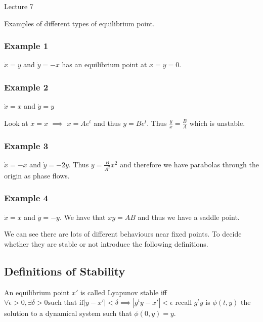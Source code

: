 \begin{center}

Lecture 7

\end{center}

Examples of different types of equilibrium point.

\subsubsection*{Example 1}

$\dot{x} = y$ and $\dot{y} = - x$ has an equilibrium point at $x = y = 0$.

\subsubsection*{Example 2}

$\dot{x} = x$ and $\dot{y} = y$

Look at $\dot{x} = x$ $\implies$ $x = Ae^t$ and thus $y = B e^t$. Thus $\frac{y}{x} = \frac{B}{A}$ which is unstable.

\subsubsection*{Example 3}

$\dot{x} = - x$ and $\dot{y} = -2y$. Thus $y = \frac{B}{A^2}x^2$ and therefore we have parabolas through the origin as phase flows.

\subsubsection*{Example 4}

$\dot{x} = x$ and $\dot{y} = -y$. We have that $xy = AB$ and thus we have a saddle point.

\vspace{\baselineskip}

We can see there are lots of different behaviours near fixed points. To decide whether they are stable or not introduce the following definitions.

\subsection{Definitions of Stability}

An equilibrium point $x'$ is called Lyapunov stable iff $\forall \epsilon > 0, \exists \delta > 0 \text{such that if} |y-x'|<\delta \implies |g^t y - x'| < \epsilon$ recall $g^t y$ is $\phi(t,y)$ the solution to a dynamical system such that $\phi(0,y) = y$.

